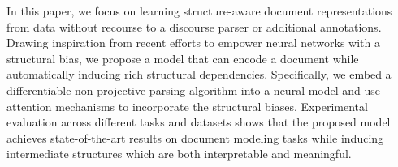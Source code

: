 In this paper, we focus on learning structure-aware document representations from data without recourse to a discourse parser or additional annotations. Drawing inspiration from recent efforts to empower neural networks with a structural bias, we propose a model that can encode a document while automatically inducing rich structural dependencies. Specifically, we embed a differentiable non-projective parsing algorithm into a neural model and use attention mechanisms to incorporate the structural biases. Experimental evaluation across different tasks and datasets shows that the proposed model achieves state-of-the-art results on document modeling tasks while inducing intermediate structures which are both interpretable and meaningful.
